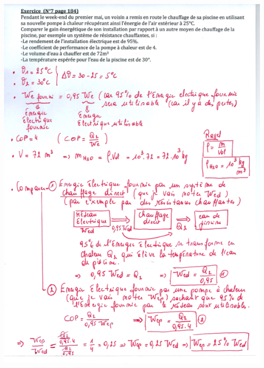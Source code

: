 \includegraphics[width=19.239cm,height=26.975cm]{Pictures/100000010000025300000343E75324A8017B0310.png}

